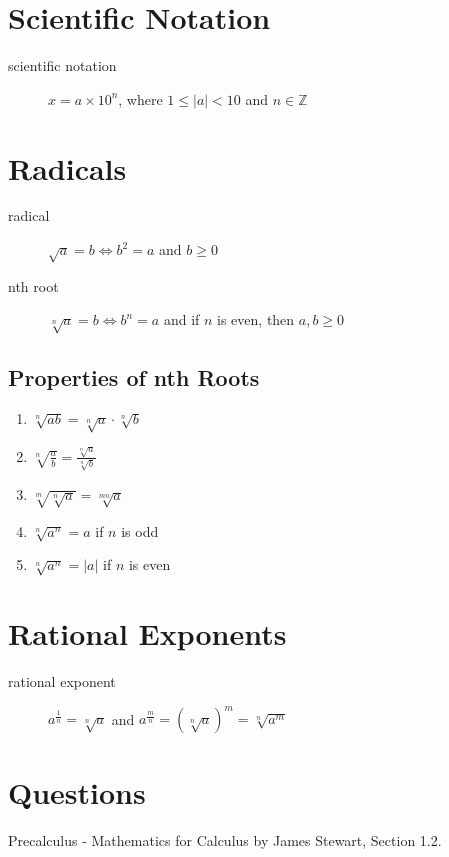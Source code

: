 \section{Scientific Notation}
\begin{description}
    \item[scientific notation] $x = a \times 10^n$, where $1 \leq |a| < 10$ and $n \in \mathbb{Z}$ 
\end{description}

\section{Radicals}
\begin{description}
    \item[radical] $\sqrt{a} = b \iff b^2 = a$ and $b \geq 0$
    \item[nth root] $\sqrt[n]{a} = b \iff b^n = a$ and if $n$ is even, then $a, b \geq 0$ 
\end{description}

\subsection{Properties of nth Roots}
\begin{enumerate}
    \item $\sqrt[n]{ab} = \sqrt[n]{a} \cdot \sqrt[n]{b}$
    \item $\sqrt[n]{\frac{a}{b}} = \frac{\sqrt[n]{a}}{\sqrt[n]{b}}$
    \item $\sqrt[m]{\sqrt[n]{a}} = \sqrt[mn]{a}$
    \item $\sqrt[n]{a^n} = a$ if $n$ is odd
    \item $\sqrt[n]{a^n} = |a|$ if $n$ is even
\end{enumerate}

\section{Rational Exponents}
\begin{description}
    \item[rational exponent] $a^{\frac{1}{n}} = \sqrt[n]{a}$ and $a^{\frac{m}{n}} = \left(\sqrt[n]{a}\right)^m = \sqrt[n]{a^m}$
\end{description}

\section{Questions}

Precalculus - Mathematics for Calculus by James Stewart, Section 1.2.